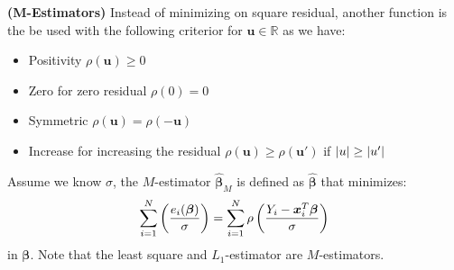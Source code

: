 \begin{definition}{\textbf{(M-Estimators)}}
    Instead of minimizing on square residual, another function is the be used with the following criterior for $\boldsymbol u \in \mathbb{R}$ as we have:
    \begin{itemize}
        \item Positivity $\rho(\boldsymbol u) \ge 0$
        \item Zero for zero residual $\rho(0) = 0$
        \item Symmetric $\rho(\boldsymbol u) = \rho(-\boldsymbol u)$
        \item Increase for increasing the residual $\rho(\boldsymbol u)\ge\rho(\boldsymbol u')$ if $\left| u \right|\ge\left| u' \right|$
    \end{itemize}
    Assume we know $\sigma$, the $M$-estimator $\hat{\boldsymbol \beta}_M$ is defined as $\hat{\boldsymbol \beta}$ that minimizes:
    \begin{equation*}
        \sum^N_{i=1}\left( \frac{e_i(\boldsymbol \beta)}{\sigma} \right) = \sum^N_{i=1}\rho\left( \frac{Y_i - \boldsymbol x_i^T\boldsymbol \beta}{\sigma} \right)
    \end{equation*}
    in $\boldsymbol \beta$. Note that the least square and $L_1$-estimator are $M$-estimators.
\end{definition}

